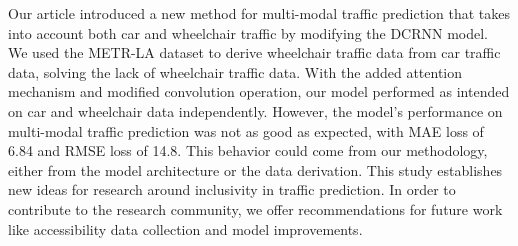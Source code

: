 Our article introduced a new method for multi-modal traffic prediction that takes into account both car and wheelchair traffic by modifying the DCRNN model.
We used the METR-LA dataset to derive wheelchair traffic data from car traffic data, solving the lack of wheelchair traffic data.
With the added attention mechanism and modified convolution operation, our model performed as intended on car and wheelchair data independently.
However, the model's performance on multi-modal traffic prediction was not as good as expected, with MAE loss of 6.84 and RMSE loss of 14.8.
This behavior could come from our methodology, either from the model architecture or the data derivation.
This study establishes new ideas for research around inclusivity in traffic prediction.
In order to contribute to the research community, we offer recommendations for future work like accessibility data collection and model improvements.
\vspace{1em}